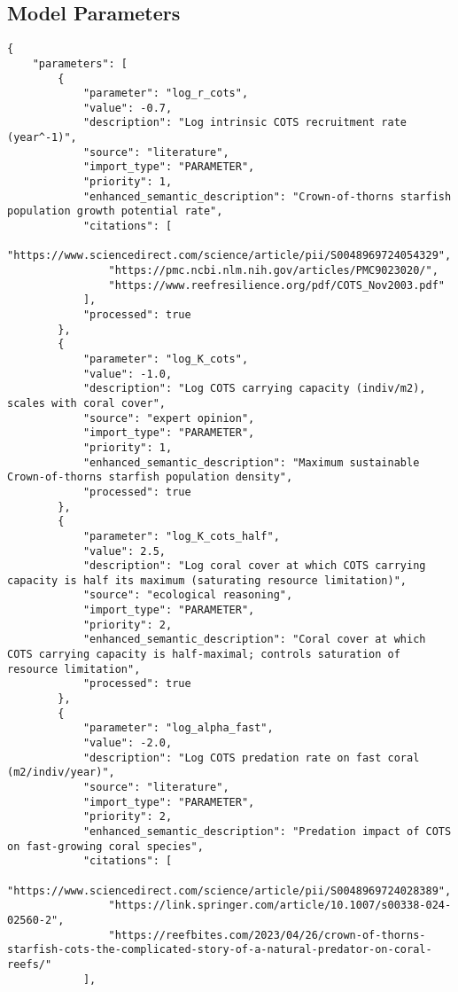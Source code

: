 \subsection{Model Parameters}
\begin{lstlisting}
{
    "parameters": [
        {
            "parameter": "log_r_cots",
            "value": -0.7,
            "description": "Log intrinsic COTS recruitment rate (year^-1)",
            "source": "literature",
            "import_type": "PARAMETER",
            "priority": 1,
            "enhanced_semantic_description": "Crown-of-thorns starfish population growth potential rate",
            "citations": [
                "https://www.sciencedirect.com/science/article/pii/S0048969724054329",
                "https://pmc.ncbi.nlm.nih.gov/articles/PMC9023020/",
                "https://www.reefresilience.org/pdf/COTS_Nov2003.pdf"
            ],
            "processed": true
        },
        {
            "parameter": "log_K_cots",
            "value": -1.0,
            "description": "Log COTS carrying capacity (indiv/m2), scales with coral cover",
            "source": "expert opinion",
            "import_type": "PARAMETER",
            "priority": 1,
            "enhanced_semantic_description": "Maximum sustainable Crown-of-thorns starfish population density",
            "processed": true
        },
        {
            "parameter": "log_K_cots_half",
            "value": 2.5,
            "description": "Log coral cover at which COTS carrying capacity is half its maximum (saturating resource limitation)",
            "source": "ecological reasoning",
            "import_type": "PARAMETER",
            "priority": 2,
            "enhanced_semantic_description": "Coral cover at which COTS carrying capacity is half-maximal; controls saturation of resource limitation",
            "processed": true
        },
        {
            "parameter": "log_alpha_fast",
            "value": -2.0,
            "description": "Log COTS predation rate on fast coral (m2/indiv/year)",
            "source": "literature",
            "import_type": "PARAMETER",
            "priority": 2,
            "enhanced_semantic_description": "Predation impact of COTS on fast-growing coral species",
            "citations": [
                "https://www.sciencedirect.com/science/article/pii/S0048969724028389",
                "https://link.springer.com/article/10.1007/s00338-024-02560-2",
                "https://reefbites.com/2023/04/26/crown-of-thorns-starfish-cots-the-complicated-story-of-a-natural-predator-on-coral-reefs/"
            ],

\end{lstlisting}
